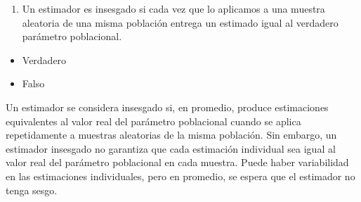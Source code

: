 \documentclass[
  letterpaper,
  DIV=11,
  numbers=noendperiod]{scrartcl}
\providecommand{\tightlist}{%
  \setlength{\itemsep}{0pt}\setlength{\parskip}{0pt}}\usepackage{longtable,booktabs,array}
\begin{document}
\begin{enumerate}
\def\labelenumi{\roman{enumi}.}
\setcounter{enumi}{2}
\tightlist
\item
  Un estimador es insesgado si cada vez que lo aplicamos a una muestra
  aleatoria de una misma población entrega un estimado igual al
  verdadero parámetro poblacional.
\end{enumerate}

\begin{itemize}
\tightlist
\item[$\square$]
  Verdadero
\item[$\boxtimes$]
  Falso
\end{itemize}

Un estimador se considera insesgado si, en promedio, produce
estimaciones equivalentes al valor real del parámetro poblacional cuando
se aplica repetidamente a muestras aleatorias de la misma población. Sin
embargo, un estimador insesgado no garantiza que cada estimación
individual sea igual al valor real del parámetro poblacional en cada
muestra. Puede haber variabilidad en las estimaciones individuales, pero
en promedio, se espera que el estimador no tenga sesgo.
\end{document}
